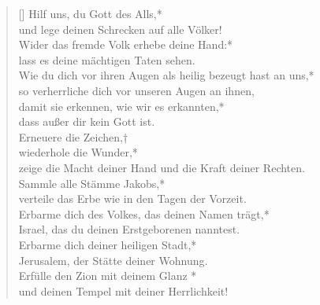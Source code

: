 \begin{verse}[\versewidth]
 Hilf uns, du Gott des Alls,*\\
 und lege deinen Schrecken auf alle Völker!\\
\vin  Wider das fremde Volk erhebe deine Hand:*\\
 \vin lass es deine mächtigen Taten sehen.\\
Wie du dich  vor ihren Augen als heilig bezeugt hast an uns,*\\
so verherrliche dich vor unseren Augen an ihnen,\\
\vin damit sie erkennen, wie wir es erkannten,*\\
\vin dass außer dir kein Gott ist.\\
Erneuere die Zeichen,†\\
wiederhole die Wunder,*\\
zeige die Macht deiner Hand und die Kraft deiner Rechten.\\

\vin Sammle alle Stämme Jakobs,*\\
\vin verteile das Erbe wie in den Tagen der Vorzeit.\\
Erbarme dich des Volkes, das deinen Namen trägt,*\\
Israel, das du deinen Erstgeborenen nanntest.\\
\vin Erbarme dich deiner heiligen Stadt,*\\
\vin Jerusalem, der Stätte deiner Wohnung.\\
Erfülle den Zion mit deinem Glanz *\\
und deinen Tempel mit deiner Herrlichkeit! \\
\end{verse}

\vspace{0.6cm}

\def\greinitialformat#1{{\fontsize{40}{40}\selectfont #1}}
\gresetfirstlineaboveinitial{\small \textcolor{red}{Ps 35 (36)}}{}
\setaboveinitialseparation{0.72mm}


\vspace{0.6cm}

\resp

